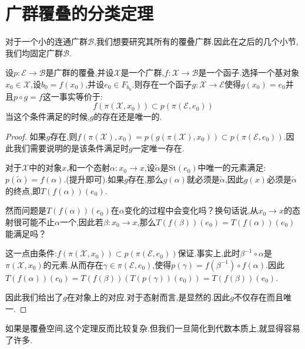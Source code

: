 \section{广群覆叠的分类定理}
对于一个小的连通广群$\mathcal{B}$,我们想要研究其所有的覆叠广群.因此在之后的几个小节,我们均固定广群$\mathcal{B}$.
\begin{theorem}[覆叠提升基本定理·广群]
    设$p:\mathcal{E}\to \mathcal{B}$是广群的覆叠,并设$\mathcal{X}$是一个广群,$f:\mathcal{X}\to \mathcal{B}$是一个函子.选择一个基对象$x_0\in \mathcal{X}$,设$b_0=f(x_0)$,并设$e_0\in F_{b_0}$.则存在一个函子$g:\mathcal{X}\to \mathcal{E}$使得$g(x_0)=e_0$并且$p\circ g=f$这一事实等价于:
    $$
    f(\pi(\mathcal{X},x_0))\subset p(\pi(\mathcal{E},e_0))
    $$
    当这个条件满足的时候,$g$的存在还是唯一的.
    
\end{theorem}
\begin{proof}
    如果$g$存在,则$f(\pi(\mathcal{X}),x_0)=p(g(\pi(\mathcal{X}),x_0))\subset p(\pi(\mathcal{E},e_0))$.因此我们需要说明的是该条件满足时$g$一定唯一存在.

    对于$\mathcal{X}$中的对象$x$,和一个态射$\alpha:x_0 \to x$,设$\tilde{\alpha}$是$\mathrm{St}(e_0)$中唯一的元素满足:$p(\tilde{\alpha})=f(\alpha)$.(提升即可).如果$g$存在,那么$g(\alpha)$就必须是$\tilde{\alpha}$,因此$g(x)$必须是$\tilde{\alpha}$的终点,即$T(f(\alpha))(e_0)$.

    然而问题是$T(f(\alpha))(e_0)$在$\alpha$变化的过程中会变化吗？换句话说,从$x_0 \to x$的态射很可能不止$\alpha$一个,因此若$\beta:x_0 \to x$,那么$T(f(\beta))(e_0)=T(f(\alpha))(e_0)$能满足吗？

    这一点由条件:$f(\pi(\mathcal{X},x_0))\subset p(\pi(\mathcal{E},e_0))$保证.事实上,此时$\beta^{-1}\circ \alpha$是$\pi(\mathcal{X},x_0)$的元素.从而存在$\gamma \in \pi(\mathcal{E},e_0)$,使得$p(\gamma)=f(\beta^{-1})\circ f(\alpha)$.因此$T(f(\alpha))(e_0)=T(f(\beta))(T(p(\gamma))(e_0))=T(f(\beta))(e_0)$.

    因此我们给出了$g$在对象上的对应.对于态射而言,是显然的.因此$g$不仅存在而且唯一.
\end{proof}
如果是覆叠空间,这个定理反而比较复杂.但我们一旦简化到代数本质上,就显得容易了许多.

